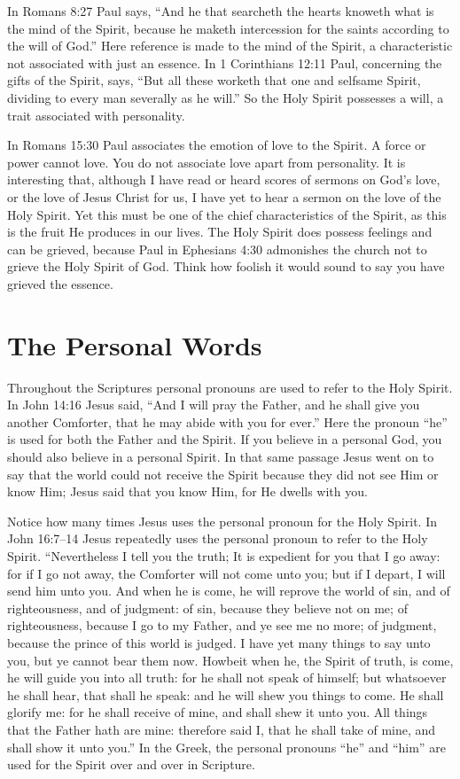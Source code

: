 In Romans 8:27 Paul says, “And he that searcheth the
hearts knoweth what is the mind of the Spirit, because he
maketh intercession for the saints according to the will of
God.” Here reference is made to the mind of the Spirit, a
characteristic not associated with just an essence. In 1 Corinthians
12:11 Paul, concerning the gifts of the Spirit, says,
“But all these worketh that one and selfsame Spirit, dividing
to every man severally as he will.” So the Holy Spirit
possesses a will, a trait associated with personality.

In Romans 15:30 Paul associates the emotion of love
to the Spirit. A force or power cannot love. You do not
associate love apart from personality. It is interesting that,
although I have read or heard scores of sermons on God’s
love, or the love of Jesus Christ for us, I have yet to hear a
sermon on the love of the Holy Spirit. Yet this must be one
of the chief characteristics of the Spirit, as this is the fruit He
produces in our lives. The Holy Spirit does possess feelings
and can be grieved, because Paul in Ephesians 4:30 admonishes
the church not to grieve the Holy Spirit of God. Think
how foolish it would sound to say you have grieved the
essence.


\section*{The Personal Words}

Throughout the Scriptures personal pronouns are used
to refer to the Holy Spirit. In John 14:16 Jesus said, “And
I will pray the Father, and he shall give you another Comforter,
that he may abide with you for ever.” Here the pronoun
“he” is used for both the Father and the Spirit. If you
believe in a personal God, you should also believe in a personal
Spirit. In that same passage Jesus went on to say that
the world could not receive the Spirit because they did not
see Him or know Him; Jesus said that you know Him, for He
dwells with you.

Notice how many times Jesus uses the personal pronoun
for the Holy Spirit. In John 16:7–14 Jesus repeatedly
uses the personal pronoun to refer to the Holy Spirit. “Nevertheless
I tell you the truth; It is expedient for you that I go
away: for if I go not away, the Comforter will not come unto
you; but if I depart, I will send him unto you. And when he
is come, he will reprove the world of sin, and of righteousness,
and of judgment: of sin, because they believe not on
me; of righteousness, because I go to my Father, and ye see
me no more; of judgment, because the prince of this world
is judged. I have yet many things to say unto you, but ye
cannot bear them now. Howbeit when he, the Spirit of truth,
is come, he will guide you into all truth: for he shall not
speak of himself; but whatsoever he shall hear, that shall he
speak: and he will shew you things to come. He shall glorify
me: for he shall receive of mine, and shall shew it unto
you. All things that the Father hath are mine: therefore said
I, that he shall take of mine, and shall show it unto you.” In
the Greek, the personal pronouns “he” and “him” are used
for the Spirit over and over in Scripture.


